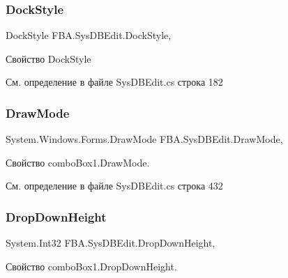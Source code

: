 \subsubsection{\texorpdfstring{Dock\+Style}{DockStyle}}
{\footnotesize\ttfamily Dock\+Style F\+B\+A.\+Sys\+D\+B\+Edit.\+Dock\+Style\hspace{0.3cm}{\ttfamily [get]}, {\ttfamily [set]}}



Свойство Dock\+Style 



См. определение в файле Sys\+D\+B\+Edit.\+cs строка 182

\mbox{\label{class_f_b_a_1_1_sys_d_b_edit_a3cee86c798ab7d85af90e150b6f0b5db}} 
\subsubsection{\texorpdfstring{Draw\+Mode}{DrawMode}}
{\footnotesize\ttfamily System.\+Windows.\+Forms.\+Draw\+Mode F\+B\+A.\+Sys\+D\+B\+Edit.\+Draw\+Mode\hspace{0.3cm}{\ttfamily [get]}, {\ttfamily [set]}}



Свойство combo\+Box1.\+Draw\+Mode. 



См. определение в файле Sys\+D\+B\+Edit.\+cs строка 432

\mbox{\label{class_f_b_a_1_1_sys_d_b_edit_adfeeab974c8b58ecb995e38e8f700d6c}} 
\subsubsection{\texorpdfstring{Drop\+Down\+Height}{DropDownHeight}}
{\footnotesize\ttfamily System.\+Int32 F\+B\+A.\+Sys\+D\+B\+Edit.\+Drop\+Down\+Height\hspace{0.3cm}{\ttfamily [get]}, {\ttfamily [set]}}



Свойство combo\+Box1.\+Drop\+Down\+Height. 



